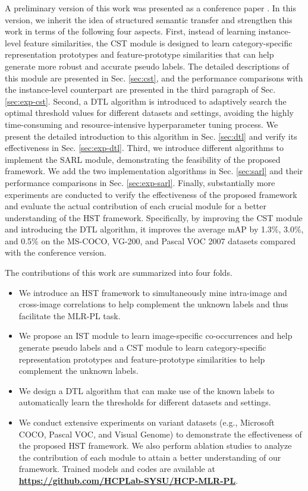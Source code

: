 A preliminary version of this work was presented as a conference paper \cite{chen2021structured}. In this version, we inherit the idea of structured semantic transfer and strengthen this work in terms of the following four aspects. First, instead of learning instance-level feature similarities, the CST module is designed to learn category-specific representation prototypes and feature-prototype similarities that can help generate more robust and accurate pseudo labels. The detailed descriptions of this module are presented in Sec. \ref{sec:cst}, and the performance comparisons with the instance-level counterpart are presented in the third paragraph of Sec. \ref{sec:exp-cst}. Second, a DTL algorithm is introduced to adaptively search the optimal threshold values for different datasets and settings, avoiding the highly time-consuming and resource-intensive hyperparameter tuning process. We present the detailed introduction to this algorithm in Sec. \ref{sec:dtl} and verify its effectiveness in Sec. \ref{sec:exp-dtl}. Third, we introduce different algorithms to implement the SARL module, demonstrating the feasibility of the proposed framework. We add the two implementation algorithms in Sec. \ref{sec:sarl} and their performance comparisons in Sec. \ref{sec:exp-sarl}. Finally, substantially more experiments are conducted to verify the effectiveness of the proposed framework and evaluate the actual contribution of each crucial module for a better understanding of the HST framework. Specifically, by improving the CST module and introducing the DTL algorithm, it improves the average mAP by 1.3\%, 3.0\%, and 0.5\% on the MS-COCO, VG-200, and Pascal VOC 2007 datasets compared with the conference version.

The contributions of this work are summarized into four folds.

\begin{itemize}

\item We introduce an HST framework to simultaneously mine intra-image and cross-image correlations to help complement the unknown labels and thus facilitate the MLR-PL task.

\item We propose an IST module to learn image-specific co-occurrences and help generate pseudo labels and a CST module to learn category-specific representation prototypes and feature-prototype similarities to help complement the unknown labels.

\item We design a DTL algorithm that can make use of the known labels to automatically learn the thresholds for different datasets and settings.

\item We conduct extensive experiments on variant datasets (e.g., Microsoft COCO, Pascal VOC, and Visual Genome) to demonstrate the effectiveness of the proposed HST framework. We also perform ablation studies to analyze the contribution of each module to attain a better understanding of our framework. Trained models and codes are available at \textbf{\url{https://github.com/HCPLab-SYSU/HCP-MLR-PL}}.

\end{itemize}

